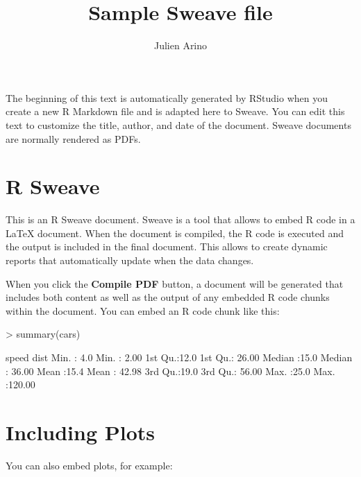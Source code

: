 \documentclass{article}
\title{Sample Sweave file}
\author{Julien Arino}
\date{}
\begin{document}
\maketitle



The beginning of this text is automatically generated by RStudio when you create a new R Markdown file and is adapted here to Sweave. 
You can edit this text to customize the title, author, and date of the document. Sweave documents are normally rendered as PDFs.

\section*{R Sweave}

This is an R Sweave document. Sweave is a tool that allows to embed R code in a LaTeX document. 
When the document is compiled, the R code is executed and the output is included in the final document. 
This allows to create dynamic reports that automatically update when the data changes.

When you click the \textbf{Compile PDF} button, a document will be generated that includes both content as well as the output of any embedded R code chunks within the document. 
You can embed an R code chunk like this:

\begin{Schunk}
\begin{Sinput}
> summary(cars)
\end{Sinput}
\begin{Soutput}
     speed           dist       
 Min.   : 4.0   Min.   :  2.00  
 1st Qu.:12.0   1st Qu.: 26.00  
 Median :15.0   Median : 36.00  
 Mean   :15.4   Mean   : 42.98  
 3rd Qu.:19.0   3rd Qu.: 56.00  
 Max.   :25.0   Max.   :120.00  
\end{Soutput}
\end{Schunk}

\section*{Including Plots}

You can also embed plots, for example:
\end{document}
